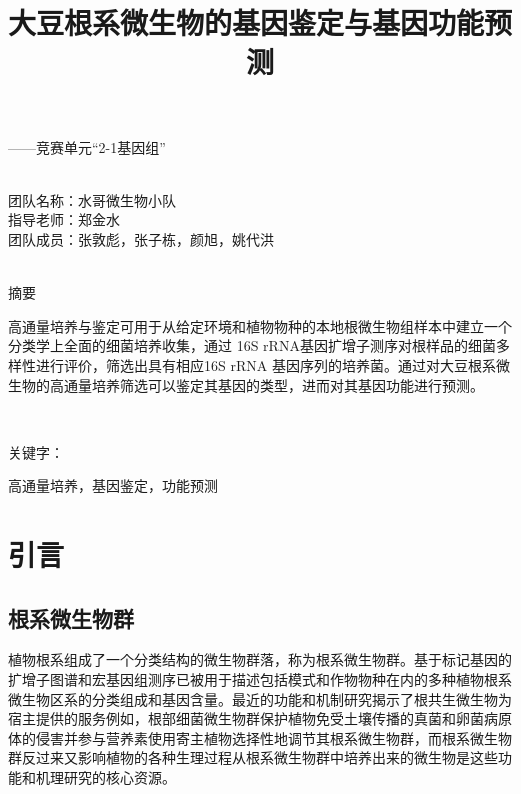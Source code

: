 \documentclass{ctexart}
\author{}
\date{}
\title{\vspace*{-1.5cm} \CJKfontspec{SimHei}大豆根系微生物的基因鉴定与基因功能预测}
\begin{document}
    \maketitle\thispagestyle{fancy}
    \vspace*{-1.5cm}

    \raggedleft
    { \heiti  ——竞赛单元“2-1基因组”}

    ~\\

    \raggedleft
        团队名称：水哥微生物小队\\
        指导老师：郑金水\\
        团队成员：张敦彪，张子栋，颜旭，姚代洪\\
    
    ~\\

    \raggedright
    { \heiti 摘要}

    { \qquad 高通量培养与鉴定可用于从给定环境和植物物种的本地根微生物组样本中建立一个分类学上全面的细菌培养收集，通过 16S rRNA基因扩增子测序对根样品的细菌多样性进行评价，筛选出具有相应16S rRNA 基因序列的培养菌。通过对大豆根系微生物的高通量培养筛选可以鉴定其基因的类型，进而对其基因功能进行预测。}
    
    ~\\

    {\heiti {} \raggedright 关键字：} { 高通量培养，基因鉴定，功能预测}

    




    \section{引言}

    \subsection{根系微生物群}

    \qquad 植物根系组成了一个分类结构的微生物群落，称为根系微生物群。基于标记基因的扩增子图谱和宏基因组测序已被用于描述包括模式和作物物种在内的多种植物根系微生物区系的分类组成和基因含量。最近的功能和机制研究揭示了根共生微生物为宿主提供的服务例如，根部细菌微生物群保护植物免受土壤传播的真菌和卵菌病原体的侵害并参与营养素使用寄主植物选择性地调节其根系微生物群，而根系微生物群反过来又影响植物的各种生理过程从根系微生物群中培养出来的微生物是这些功能和机理研究的核心资源。
\end{document}

